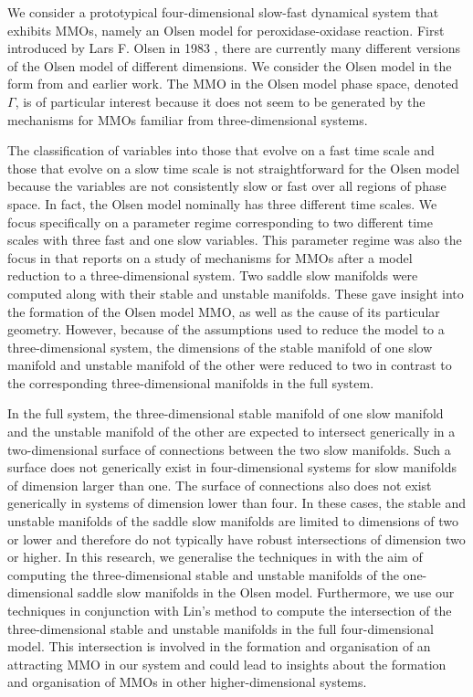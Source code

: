 \documentclass{ws-ijbc}
\begin{document}
We consider a prototypical four-dimensional slow-fast dynamical system that exhibits MMOs, namely an Olsen model for peroxidase-oxidase reaction.  First introduced by Lars F. Olsen in 1983  \cite{Olsen}, there are currently many different versions of the Olsen model of different dimensions.  We consider the Olsen model in the form from \cite{Rescaling} and earlier work.  The MMO in the Olsen model phase space, denoted $\Gamma$, is of particular interest because it does not seem to be generated by the mechanisms for MMOs familiar from three-dimensional systems.

The classification of variables into those that evolve on a fast time scale and those that evolve on a slow time scale is not straightforward for the Olsen model because the variables are not consistently slow or fast over all regions of phase space.  In fact, the Olsen model nominally has three different time scales.  We focus specifically on a parameter regime corresponding to two different time scales with three fast and one slow variables.  This parameter regime was also the focus in \cite{QSSA} that reports on a study of mechanisms for MMOs after a model reduction to a three-dimensional system.  Two saddle slow manifolds were computed along with their stable and unstable manifolds.  These gave insight into the formation of the Olsen model MMO, as well as the cause of its particular geometry.  However, because of the assumptions used to reduce the model to a three-dimensional system, the dimensions of the stable manifold of one slow manifold and unstable manifold of the other were reduced to two in contrast to the corresponding three-dimensional manifolds in the full system.  

In the full system, the three-dimensional stable manifold of one slow manifold and the unstable manifold of the other are expected to intersect generically in a two-dimensional surface of connections between the two slow manifolds.  Such a surface does not generically exist in four-dimensional systems for slow manifolds of dimension larger than one.  The surface of connections also does not exist generically in systems of dimension lower than four.  In these cases, the stable and unstable manifolds of the saddle slow manifolds are limited to dimensions of two or lower and therefore do not typically have robust intersections of dimension two or higher.  In this research, we generalise the techniques in \cite{Saeed_Paper} with the aim of computing the three-dimensional stable and unstable manifolds of the one-dimensional saddle slow manifolds in the Olsen model.  Furthermore, we use our techniques in conjunction with Lin's method to compute the intersection of the three-dimensional stable and unstable manifolds in the full four-dimensional model.  This intersection is involved in the formation and organisation of an attracting MMO in our system and could lead to insights about the formation and organisation of MMOs in other higher-dimensional systems.
\end{document}
